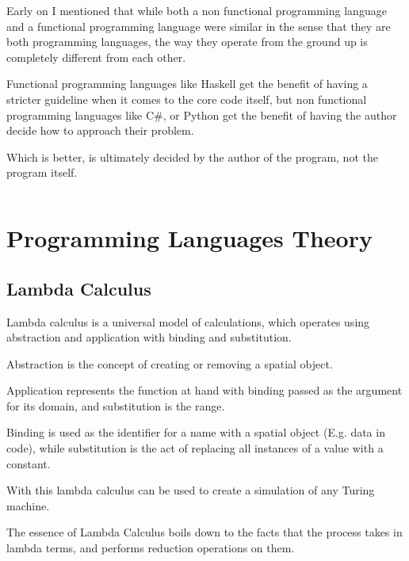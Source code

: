 \documentclass{article}
\begin{document}
\medskip\noindent
Early on I mentioned that while both a non functional programming language and a functional programming language were similar in the sense that they are both programming languages, the way they operate from the ground up is completely different from each other. 

\medskip\noindent
Functional programming languages like Haskell get the benefit of having a stricter guideline when it comes to the core code itself, but non functional programming languages like C\#, or Python get the benefit of having the author decide how to approach their problem. 

\medskip\noindent
Which is better, is ultimately decided by the author of the program, not the program itself.

\medskip\medskip
\begin{lstlisting}
\end{lstlisting}

\medskip

\section{Programming Languages Theory}
\medskip\medskip
\subsection{Lambda Calculus}
\hspace{\parindent} 

Lambda calculus is a universal model of calculations, which operates using abstraction and application with binding and substitution. 

\medskip\noindent
Abstraction is the concept of creating or removing a spatial object. 

\medskip\noindent
Application represents the function at hand with binding passed as the argument for its domain, and substitution is the range. 

\medskip\noindent
Binding is used as the identifier for a name with a spatial object (E.g. data in code), while substitution is the act of replacing all instances of a value with a constant. 

\medskip\noindent
With this lambda calculus can be used to create a simulation of any Turing machine. 

\medskip\noindent
The essence of Lambda Calculus boils down to the facts that the process takes in lambda terms, and performs reduction operations on them. 
\end{document}
